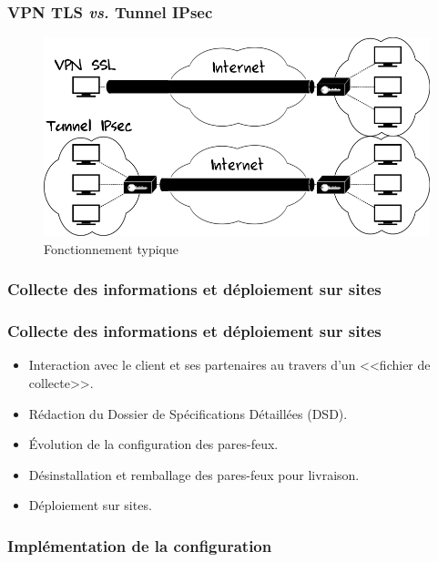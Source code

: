 \documentclass[french, a4paper]{beamer}
\begin{document}
\begin{frame}
    \frametitle{VPN TLS \textit{vs.} Tunnel IPsec}
    \begin{figure}[h!]
        \centering
        \includegraphics[width = \linewidth]{img/misc/tls-vs-ipsec.png}
        \caption{Fonctionnement typique}%
        \label{fig:misc/tls-vs-ipsec}
    \end{figure}
\end{frame}

\subsubsection{Collecte des informations et déploiement sur sites}

\begin{frame}
    \frametitle{Collecte des informations et déploiement sur sites}
    \begin{itemize}
        \item Interaction avec le client et ses partenaires au travers d'un
            <<fichier de collecte>>.
        \item Rédaction du Dossier de Spécifications Détaillées (DSD).
        \item Évolution de la configuration des pares-feux.
        \item Désinstallation et remballage des pares-feux pour livraison.
        \item Déploiement sur sites.
    \end{itemize}
\end{frame}

\subsubsection{Implémentation de la configuration}
\end{document}
